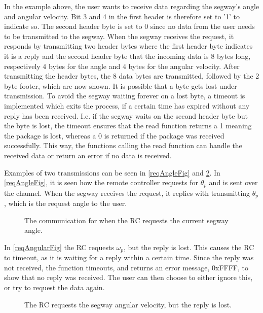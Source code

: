 In the example above, the user wants to receive data regarding the segway's angle and angular velocity. Bit 3 and 4 in the first header is therefore set to '1' to indicate so. The second header byte is set to 0 since no data from the user needs to be transmitted to the segway. When the segway receives the request, it responds by transmitting two header bytes where the first header byte indicates it is a reply and the second header byte that the incoming data is 8 bytes long, respectively 4 bytes for the angle and 4 bytes for the angular velocity. After transmitting the header bytes, the 8 data bytes are transmitted, followed by the 2 byte footer, which are now shown. 
It is possible that a byte gets lost under transmission. To avoid the segway waiting forever on a lost byte, a timeout is implemented which exits the process, if a certain time has expired without any reply has been received. I.e. if the segway waits on the second header byte but the byte is lost, the timeout ensures that the read function returns a 1 meaning the package is lost, whereas a 0 is returned if the package was received successfully. This way, the functions calling the read function can handle the received data or return an error if no data is received.

Examples of two transmissions can be seen in \autoref{reqAngleFig} and \ref{reqAngularFig}. In \autoref{reqAngleFig}, it is seen how the remote controller requests for $\theta_p$ and is sent over the channel. When the segway receives the request, it replies with transmitting $\theta_p$, which is the request angle to the user.

\begin{figure}[H]
\centering

\caption{The communication for when the RC requests the current segway angle.}
\label{reqAngleFig}
\end{figure}

In \autoref{reqAngularFig} the RC requests $\omega_p$, but the reply is lost. This causes the RC to timeout, as it is waiting for a reply within a certain time. Since the reply was not received, the function timeouts, and returns an error message, 0xFFFF, to show that no reply was received. The user can then choose to either ignore this, or try to request the data again.

\begin{figure}[H]
\centering

\caption{The RC requests the segway angular velocity, but the reply is lost.}
\label{reqAngularFig}
\end{figure}

